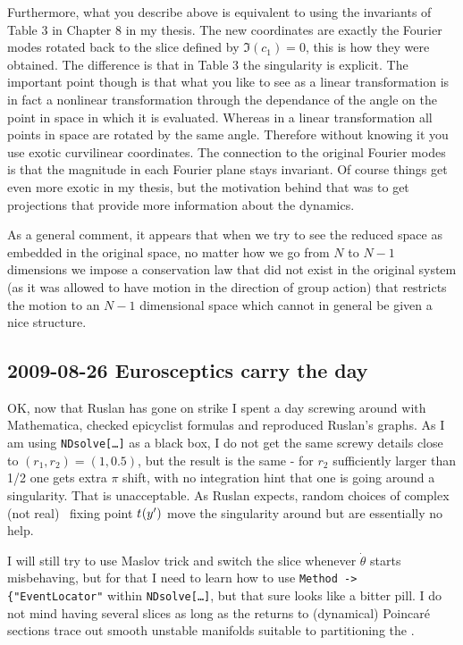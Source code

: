 Furthermore, what you describe above is equivalent to using
the invariants of Table 3 in Chapter 8 in my thesis. The new
coordinates are exactly the Fourier modes rotated back to the
slice defined by $\Im(c_1)=0$, this is how they were
obtained. The difference is that in Table 3 the singularity
is explicit. The important point though is that what you like
to see as a linear transformation is in fact a nonlinear
transformation through the dependance of the angle on the
point in space in which it is evaluated. Whereas in a linear
transformation all points in space are rotated by the same
angle. Therefore without knowing it you use exotic
curvilinear coordinates. The connection to the original
Fourier modes is that the magnitude in each Fourier plane
stays invariant. Of course things get even more exotic in my
thesis, but the motivation behind that was to get projections
that provide more information about the dynamics.

As a general comment, it appears that when we try to see the
reduced space as embedded in the original space, no matter
how we go from $N$ to $N-1$ dimensions we impose a
conservation law that did not exist in the original system
(as it was allowed to have motion in the direction of group
action) that restricts the motion to an $N-1$ dimensional
space which cannot in general be given a nice structure.

\subsection{2009-08-26 Eurosceptics carry the day}

 OK, now that Ruslan has gone on
strike I spent a day screwing around with Mathematica,
checked epicyclist formulas and reproduced Ruslan's graphs.
As I am using \texttt{NDsolve[\dots]} as a black box, I do
not get the same screwy details close to $(r_1,r_2)=(1,0.5)$,
but the result is the same - for $r_2$ sufficiently larger
than 1/2 one gets extra $\pi$ shift, with no integration hint
that one is going around a singularity. That is unacceptable.
As Ruslan expects,
random choices of complex (not real) \slice\ fixing
point $t_{}(y')$ move the singularity around but are essentially no
help.

I will still try to use Maslov trick and switch the slice
whenever $\dot{\theta}$ starts misbehaving, but for that I
need to learn how to use \texttt{Method -> \{"EventLocator"}
within \texttt{NDsolve[\dots]}, but that sure looks like a
bitter pill. I do not mind having several slices as long as
the returns to (dynamical) Poincar\'e sections trace out
smooth unstable manifolds suitable to partitioning the
\reducedsp.

